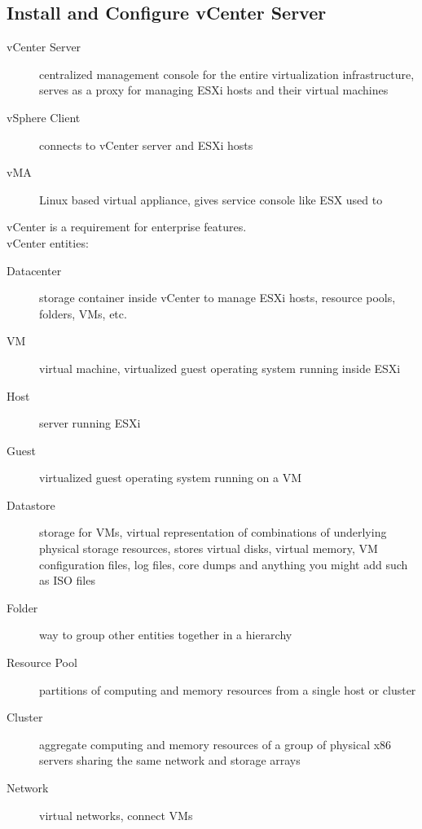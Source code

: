 \subsection{Install and Configure vCenter Server}

\begin{description}

\item[vCenter Server]
centralized management console for the entire virtualization infrastructure, serves as a proxy
for managing ESXi hosts and their virtual machines

\item[vSphere Client]
connects to vCenter server and ESXi hosts

\item[vMA]
Linux based virtual appliance, gives service console like ESX used to

\end{description}

vCenter is a requirement for enterprise features.\\

vCenter entities:

\begin{description}

\item[Datacenter]
storage container inside vCenter to manage ESXi hosts, resource pools, folders,
VMs, etc.

\item[VM]
virtual machine, virtualized guest operating system running inside ESXi

\item[Host]
server running ESXi

\item[Guest]
virtualized guest operating system running on a VM

\item[Datastore]
storage for VMs, virtual representation of combinations of underlying
physical storage resources, stores virtual disks, virtual memory, VM
configuration files, log files, core dumps and anything you might add such
as ISO files

\item[Folder]
way to group other entities together in a hierarchy

\item[Resource Pool]
partitions of computing and memory resources from a single host or cluster

\item[Cluster]
aggregate computing and memory resources of a group of physical x86 servers
sharing the same network and storage arrays

\item[Network]
virtual networks, connect VMs

\end{description}

